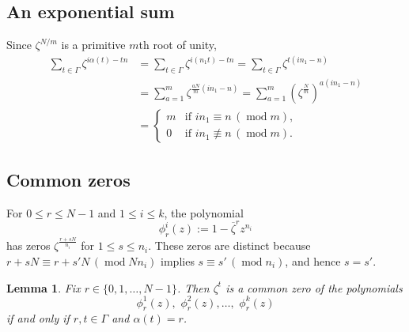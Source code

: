 \documentclass[10pt,reqno]{amsart}
\newcommand{\0}{\color{lightgray}0}
\renewcommand{\o}[1]{\overline{#1}}
\renewcommand{\pmod}[1]{\,(\operatorname{mod} #1)}
\renewcommand\>{\rangle}
\newcommand\<{\langle}
\theoremstyle{plain}
\newtheorem{Lemma}[equation]{Lemma}
\theoremstyle{definition}
\begin{document}
\subsection{An exponential sum}
Since $\zeta^{ N/m}$ is a primitive $m$th root of unity, 
\begin{align}
\sum_{t \in \Gamma} \zeta^{i\alpha(t)-tn}
&= \sum_{t \in \Gamma} \zeta^{i (n_1 t) -tn} 
= \sum_{t \in \Gamma} \zeta^{t (i n_1 -n)} \nonumber\\
&= \sum_{a=1}^{m } \zeta^{ \frac{aN}{m}(i n_1 -n)}
= \sum_{a=1}^{m} (\zeta^{ \frac{N}{m}})^{a(i n_1 -n)} \nonumber \\
&=
\begin{cases}
m & \text{if $in_1 \equiv n \pmod{ m}$}, \\[5pt]
0 & \text{if $i n_1 \not\equiv n \pmod{ m}$}.
\end{cases}
\label{eq:Finale}
\end{align}

\subsection{Common zeros}
For $0 \leq r \leq N-1$ and $1 \leq i \leq k$, 
the polynomial
\begin{equation*}
\phi_r^i(z):=1-\o{\zeta}^r z^{n_i}
\end{equation*}
has zeros $\zeta^{\frac{r+sN}{n_i}}$ for $1 \leq s \leq n_i$.
These zeros are distinct because $r+sN \equiv r + s'N \pmod{Nn_i} $ implies 
$s \equiv s' \pmod{n_i}$, and hence $s=s'$.

\begin{Lemma}\label{Lemma:Common}
    Fix $r \in \{0,1,\ldots,N-1\}$.  Then
    $\zeta^t$ is a common zero of the polynomials
    \begin{equation}\label{eq:fiji}
        \phi_r^1(z),\,\,\phi_r^2(z),\ldots,\,\,\phi_r^k(z)
    \end{equation}
    if and only if $r,t \in \Gamma$ and $\alpha(t) = r$.
\end{Lemma}
\end{document}
